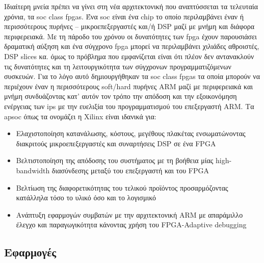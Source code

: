 Ιδιαίτερη μνεία πρέπει να γίνει στη νέα αρχιτεκτονική που αναπτύσσεται τα τελευταία χρόνια, τα \gls{soc} class \gls{fpga}s. Ένα \gls{soc} είναι ένα chip το οποίο περιλαμβάνει έναν ή περισσότερους πυρήνες -- μικροεπεξεργαστές και/ή DSP μαζί με μνήμη και διάφορα περιφερειακά. Με τη πάροδο του χρόνου οι δυνατότητες των \gls{fpga} έχουν παρουσιάσει δραματική αύξηση και ένα σύγχρονο \gls{fpga} μπορεί να περιλαμβάνει χιλιάδες αθροιστές, DSP slices κα. όμως το πρόβλημα που εμφανίζεται είναι ότι πλέον δεν αντανακλούν τις δυνατότητες και τη λειτουργικότητα των σύγχρονων προγραμματιζόμενων συσκευών. Για το λόγο αυτό δημιουργήθηκαν τα \gls{soc} class \gls{fpga}s τα οποία μπορούν να περιέχουν έναν η περισσότερους soft/hard πυρήνες ARM μαζί με περιφερειακά και μνήμη συνδυάζοντας κατ' αυτόν τον τρόπο την απόδοση και την εξοικονόμηση ενέργειας των \glspl{ip} με την ευελιξία του προγραμματισμού του επεξεργαστή ARM. Τα \gls{apsoc} όπως τα ονομάζει η Xilinx είναι ιδανικά για:
\begin{itemize}
  \item Ελαχιστοποίηση κατανάλωσης, κόστους, μεγέθους πλακέτας ενσωματώνοντας διακριτούς μικροεπεξεργαστές και συναρτήσεις DSP σε ένα FPGA
  \item Βελτιστοποίηση της απόδοσης του συστήματος με τη βοήθεια μίας high-bandwidth διασύνδεσης μεταξύ του επεξεργαστή και του FPGA
  \item Βελτίωση της διαφορετικότητας του τελικού προϊόντος προσαρμόζοντας κατάλληλα τόσο το υλικό όσο και το λογισμικό
  \item Ανάπτυξη εφαρμογών συμβατών με την αρχιτεκτονική ARM με απαράμιλλο έλεγχο και παραγωγικότητα κάνοντας χρήση του FPGA-Adaptive debugging
\end{itemize}
\subsection{Εφαρμογές}

